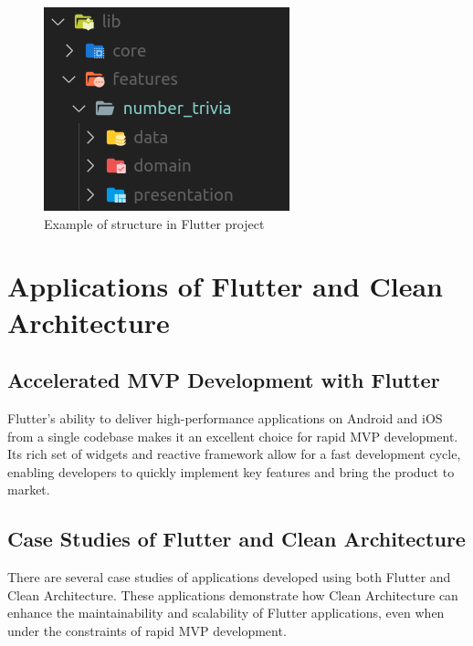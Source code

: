 \begin{figure}[H]
\begin {minipage}{0.38\textwidth}
    \includegraphics[width=\linewidth]{../images/number_trivia-feature-folder-structure.png}
    \caption{Example of structure in Flutter project}\label{Fig:example-flutter-ca-folder}
    \end{minipage}
\end{figure}
\section{Applications of Flutter and Clean Architecture}
\subsection{Accelerated MVP Development with Flutter}
Flutter's ability to deliver high-performance applications on Android and iOS from a single codebase makes it an excellent choice for rapid MVP development. Its rich set of widgets and reactive framework allow for a fast development cycle, enabling developers to quickly implement key features and bring the product to market.
\subsection{Case Studies of Flutter and Clean Architecture}
There are several case studies of applications developed using both Flutter and Clean Architecture. These applications demonstrate how Clean Architecture can enhance the maintainability and scalability of Flutter applications, even when under the constraints of rapid MVP development.

